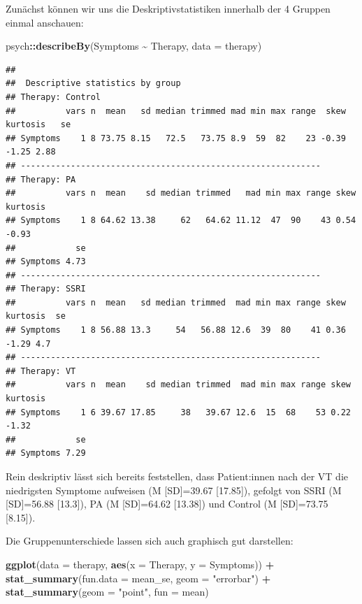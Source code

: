 \documentclass[
]{book}
\newenvironment{Shaded}{\begin{snugshade}}{\end{snugshade}}
\newcommand{\AttributeTok}[1]{\textcolor[rgb]{0.13,0.29,0.53}{#1}}
\newcommand{\FunctionTok}[1]{\textcolor[rgb]{0.13,0.29,0.53}{\textbf{#1}}}
\newcommand{\NormalTok}[1]{#1}
\newcommand{\SpecialCharTok}[1]{\textcolor[rgb]{0.81,0.36,0.00}{\textbf{#1}}}
\newcommand{\StringTok}[1]{\textcolor[rgb]{0.31,0.60,0.02}{#1}}
\begin{document}
Zunächst können wir uns die Deskriptivstatistiken innerhalb der 4 Gruppen einmal anschauen:

\begin{Shaded}
\begin{Highlighting}[]
\NormalTok{psych}\SpecialCharTok{::}\FunctionTok{describeBy}\NormalTok{(Symptoms }\SpecialCharTok{\textasciitilde{}}\NormalTok{ Therapy, }\AttributeTok{data =}\NormalTok{ therapy)}
\end{Highlighting}
\end{Shaded}

\begin{verbatim}
## 
##  Descriptive statistics by group 
## Therapy: Control
##          vars n  mean   sd median trimmed mad min max range  skew kurtosis   se
## Symptoms    1 8 73.75 8.15   72.5   73.75 8.9  59  82    23 -0.39    -1.25 2.88
## ------------------------------------------------------------ 
## Therapy: PA
##          vars n  mean    sd median trimmed   mad min max range skew kurtosis
## Symptoms    1 8 64.62 13.38     62   64.62 11.12  47  90    43 0.54    -0.93
##            se
## Symptoms 4.73
## ------------------------------------------------------------ 
## Therapy: SSRI
##          vars n  mean   sd median trimmed  mad min max range skew kurtosis  se
## Symptoms    1 8 56.88 13.3     54   56.88 12.6  39  80    41 0.36    -1.29 4.7
## ------------------------------------------------------------ 
## Therapy: VT
##          vars n  mean    sd median trimmed  mad min max range skew kurtosis
## Symptoms    1 6 39.67 17.85     38   39.67 12.6  15  68    53 0.22    -1.32
##            se
## Symptoms 7.29
\end{verbatim}

Rein deskriptiv lässt sich bereits feststellen, dass Patient:innen nach der VT die niedrigsten Symptome aufweisen (M {[}SD{]}=39.67 {[}17.85{]}), gefolgt von SSRI (M {[}SD{]}=56.88 {[}13.3{]}), PA (M {[}SD{]}=64.62 {[}13.38{]}) und Control (M {[}SD{]}=73.75 {[}8.15{]}).

Die Gruppenunterschiede lassen sich auch graphisch gut darstellen:

\begin{Shaded}
\begin{Highlighting}[]
\FunctionTok{ggplot}\NormalTok{(}\AttributeTok{data =}\NormalTok{ therapy, }\FunctionTok{aes}\NormalTok{(}\AttributeTok{x =}\NormalTok{ Therapy, }\AttributeTok{y =}\NormalTok{ Symptoms)) }\SpecialCharTok{+}
  \FunctionTok{stat\_summary}\NormalTok{(}\AttributeTok{fun.data =}\NormalTok{ mean\_se,  }\AttributeTok{geom =} \StringTok{"errorbar"}\NormalTok{) }\SpecialCharTok{+}
  \FunctionTok{stat\_summary}\NormalTok{(}\AttributeTok{geom =} \StringTok{"point"}\NormalTok{, }\AttributeTok{fun =}\NormalTok{ mean) }
\end{Highlighting}
\end{Shaded}
\end{document}
